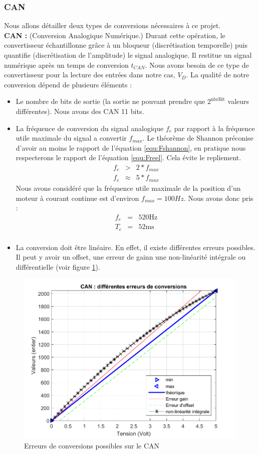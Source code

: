 \subsubsection{CAN}
Nous allons détailler deux types de conversions nécessaires à ce projet. \\
\hspace{3mm} \textbf{CAN :} (Conversion Analogique Numérique.) Durant cette opération, le convertisseur échantillonne grâce à un bloqueur (discrétisation temporelle) puis quantifie (discrétisation de l'amplitude) le signal analogique. Il restitue un signal numérique après un temps de conversion $t_{CAN}$. Nous avons besoin de ce type de convertisseur pour la lecture des entrées dans notre cas, $V_{D}$. La qualité de notre conversion dépend de plusieurs éléments : 
\begin{itemize}
\item Le nombre de bits de sortie (la sortie ne pouvant prendre que $2^{\text{nbrBit}}$ valeurs différentes). Nous avons des CAN 11 bits.
\item La fréquence de conversion du signal analogique $f_{e}$ par rapport à la fréquence utile maximale du signal a convertir $f_{max}$. Le théorème de Shannon préconise d'avoir au moins le rapport de l'équation \ref{equ:Fshannon}, en pratique nous respecterons le rapport de l'équation \ref{equ:Freel}. Cela évite le repliement.
\begin{eqnarray}
\label{equ:Fshannon} f_e &>& 2*f_{max}\\
\label{equ:Freel} f_e & \approx & 5*f_{max}
\end{eqnarray}
Nous avons considéré que la fréquence utile maximale de la position d'un moteur à courant continue est d'environ $f_{max} = 100Hz$. Nous avons donc pris :
\begin{eqnarray}
\label{equ:fe}f_e &=& 520\text{Hz}\\
\label{equ:Te} T_e &=& 52 \text{ms}\\
\end{eqnarray}
\item La conversion doit être linéaire. En effet, il existe différentes erreurs possibles. Il peut y avoir un offset, une erreur de gainn une non-linéarité intégrale ou différentielle (voir figure \ref{fig:errCAN}).
\end{itemize}
\begin{figure}[!ht]
\centering 
\includegraphics[width=.6\textwidth]{./V/images/CAN.pdf}
\caption{\label{fig:errCAN}Erreurs de conversions possibles sur le CAN}
\end{figure}
